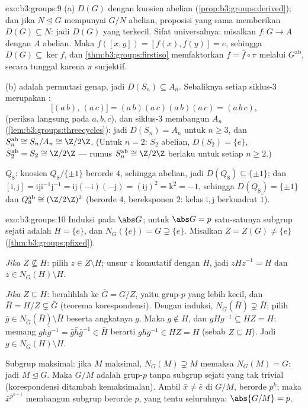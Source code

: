 \begin{solution}{exo:b3:groups:9}
(a) $D(G)$  dengan kuosien abelian
(\cref{prop:b3:groups:derived}); dan jika $N \trianglelefteq G$ mempunyai
$G/N$ abelian, proposisi yang sama memberikan $D(G) \subseteq N$: jadi
$D(G)$ yang terkecil. Sifat universalnya: misalkan $f \colon G \to A$
dengan $A$ abelian. Maka $f([x,y]) = [f(x), f(y)] = e$, sehingga $D(G)
\subseteq \ker f$, dan \cref{thm:b3:groups:firstiso} memfaktorkan $f =
\bar f \circ \pi$ melalui $G^{\mathrm{ab}}$, secara tunggal karena $\pi$
surjektif.

(b)  adalah permutasi genap, jadi $D(S_n) \subseteq A_n$.
Sebaliknya setiap siklus-$3$ merupakan :
\[
\bigl[(a\,b),\,(a\,c)\bigr] = (a\,b)(a\,c)(a\,b)(a\,c) =
(a\,b\,c),
\]
(periksa langsung pada $a, b, c$), dan siklus-$3$ membangun $A_n$
(\cref{lem:b3:groups:threecycles}): jadi $D(S_n) = A_n$ untuk $n \geq 3$,
dan $S_n^{\mathrm{ab}} \cong S_n/A_n \cong \Z/2\Z$. (Untuk $n = 2$:
$S_2$ abelian, $D(S_2) = \{e\}$, $S_2^{\mathrm{ab}} = S_2
\cong \Z/2\Z$ --- rumus $S_n^{\mathrm{ab}} \cong \Z/2\Z$
berlaku untuk setiap $n \geq 2$.)

$Q_8$: kuosien $Q_8/\{\pm 1\}$ berorde $4$, sehingga
abelian, jadi $D(Q_8) \subseteq \{\pm 1\}$; dan $[\mathrm i, \mathrm
j] = \mathrm i \mathrm j \mathrm i^{-1}\mathrm j^{-1} = \mathrm
i\mathrm j(-\mathrm i)(-\mathrm j) = (\mathrm i \mathrm j)^2 =
\mathrm k^2 = -1$, sehingga $D(Q_8) = \{\pm 1\}$ dan
$Q_8^{\mathrm{ab}} \cong (\Z/2\Z)^2$ (berorde $4$, bereksponen $2$:
kelas $\mathrm i, \mathrm j$ berkuadrat $\bar 1$).
\end{solution}

\begin{solution}{exo:b3:groups:10}
Induksi pada $\abs G$; untuk $\abs G = p$ satu-satunya subgrup
sejati adalah $H = \{e\}$, dan $N_G(\{e\}) = G \supsetneq
\{e\}$. Misalkan $Z = Z(G) \neq \{e\}$ (\cref{thm:b3:groups:pfixed}).

\emph{Jika $Z \not\subseteq H$}: pilih $z \in Z \setminus H$; unsur $z$
komutatif dengan $H$, jadi $zHz^{-1} = H$ dan $z \in N_G(H) \setminus
H$.

\emph{Jika $Z \subseteq H$}: beralihlah ke $\bar G = G/Z$, yaitu grup-$p$ yang
lebih kecil, dan $\bar H = H/Z \subsetneq \bar G$ (teorema
korespondensi). Dengan induksi, $N_{\bar G}(\bar H) \supsetneq \bar H$;
pilih $\bar g \in N_{\bar G}(\bar H) \setminus \bar H$ beserta angkatnya
$g$. Maka $g \notin H$, dan $gHg^{-1} \subseteq HZ = H$: memang
$\overline{ghg^{-1}} = \bar g \bar h \bar g^{-1} \in \bar H$ berarti
$ghg^{-1} \in HZ = H$ (sebab $Z \subseteq H$). Jadi $g \in
N_G(H)\setminus H$.

Subgrup maksimal: jika $M$ maksimal, $N_G(M) \supsetneq M$
memaksa $N_G(M) = G$: jadi $M \trianglelefteq G$. Maka $G/M$ adalah
grup-$p$ tanpa subgrup sejati yang tak trivial (korespondensi ditambah
kemaksimalan). Ambil $\bar x \neq \bar e$ di $G/M$, berorde $p^k$;
maka $\bar x^{p^{k-1}}$ membangun subgrup berorde $p$, yang
tentu seluruhnya: $\abs{G/M} = p$.
\end{solution}

